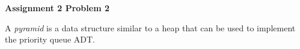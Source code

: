 \documentclass[12pt]{article}
\begin{document}
	
	\begin{center}
		{\Large\bf Assignment 2 Problem 2}\\
		\vspace{3mm}
	\end{center}
	
	\def\question#1{\item[\bf #1.]}
	\def\part#1{\item[\bf #1)]}
	\newcommand{\pc}[1]{\mbox{\textbf{#1}}} %
	
	
	
	
		A \emph{pyramid} is a data structure similar to a heap that can be used
	to implement the priority queue ADT.
	
\end{document}

